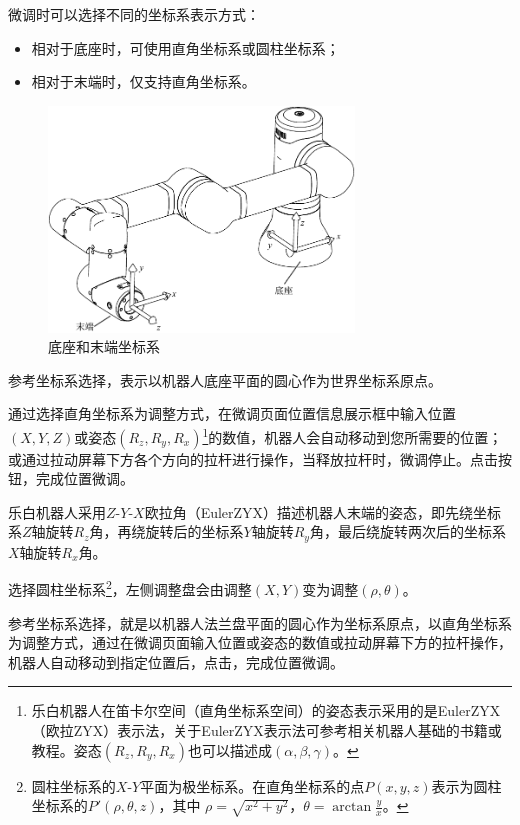 微调时可以选择不同的坐标系表示方式：
\begin{itemize}
	\item 相对于底座时，可使用直角坐标系或圆柱坐标系；
	\item 相对于末端时，仅支持直角坐标系。
\end{itemize}

\begin{figure}[ht]
	\centering
	\includegraphics[height=6cm]{line_graphs/fine_tuning_coordinate.pdf}
	\caption{底座和末端坐标系}
	\label{fig:坐标空间示意图}
\end{figure}

参考坐标系选择，表示以机器人底座平面的圆心作为世界坐标系原点。

通过选择直角坐标系为调整方式，在微调页面位置信息展示框中输入位置$(X, Y, Z)$或姿态$(R_z, R_y, R_x)$\footnote{乐白机器人在笛卡尔空间（直角坐标系空间）的姿态表示采用的是EulerZYX（欧拉ZYX）表示法，关于EulerZYX表示法可参考相关机器人基础的书籍或教程。姿态$(R_z, R_y, R_x)$也可以描述成$(\alpha, \beta, \gamma)$。}的数值，机器人会自动移动到您所需要的位置；或通过拉动屏幕下方各个方向的拉杆进行操作，当释放拉杆时，微调停止。点击按钮，完成位置微调。

乐白机器人采用$Z\textrm{-}Y\textrm{-}X$欧拉角（EulerZYX）描述机器人末端的姿态，即先绕坐标系$Z$轴旋转$R_z$角，再绕旋转后的坐标系$Y$轴旋转$R_y$角，最后绕旋转两次后的坐标系$X$轴旋转$R_x$角。

选择圆柱坐标系\footnote{圆柱坐标系的$X\textrm{-}Y$平面为极坐标系。在直角坐标系的点$P(x, y, z)$表示为圆柱坐标系的$P'(\rho, \theta, z)$，其中 $\rho=\sqrt{x^2+y^2}$，$\theta=\arctan\frac{y}{x}$。}，左侧调整盘会由调整$(X, Y)$变为调整$(\rho, \theta)$。

参考坐标系选择，就是以机器人法兰盘平面的圆心作为坐标系原点，以直角坐标系为调整方式，通过在微调页面输入位置或姿态的数值或拉动屏幕下方的拉杆操作，机器人自动移动到指定位置后，点击，完成位置微调。

